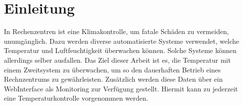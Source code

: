 \section{Einleitung}
In Rechenzentren ist eine Klimakontrolle, um fatale Schäden zu vermeiden, unumgänglich. Dazu werden diverse automatisierte Systeme verwendet, welche Temperatur und Luftfeuchtigkeit überwachen können. Solche Systeme können allerdings selber ausfallen. Das Ziel dieser Arbeit ist es, die Temperatur mit einem Zweitsystem zu überwachen, um so den dauerhaften Betrieb eines Rechnzentrums zu gewährleisten. Zusätzlich werden diese Daten über ein WebInterface als Monitoring zur Verfügung gestellt. Hiermit kann zu jederzeit eine Temperaturkontrolle vorgenommen werden.\\
\newpage